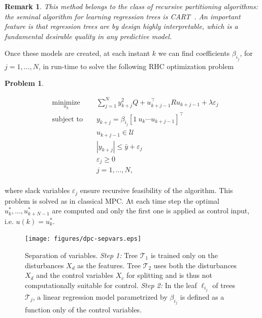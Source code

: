 \documentclass[letterpaper, 10 pt, conference]{ifacconf}  %
\newtheorem{problem}{Problem}
\newtheorem{remark}{Remark}
\begin{document}
\begin{remark}
	This method belongs to the class of recursive partitioning algorithms: the seminal algorithm for learning regression trees is CART~\cite{Breiman1984classification}. An important feature is that regression trees are by design highly interpretable, which is a fundamental desirable quality in any predictive model.
\end{remark}
Once these models are created, at each instant $k$ we can find coefficients $\beta_{i_j}$, for $j=1,\ldots,N$, in run-time to solve the following RHC optimization problem
\begin{problem}\label{pbDPC}

\small
\begin{equation*}
\begin{aligned}
& \underset{u_k}{\text{minimize}} & &  \sum_{j=1}^{N} y_{k+j}^2 Q + u^\top_{k+j-1} R u_{k+j-1} +  \lambda\varepsilon_j  \\
& \text{subject to }            & &  y_{k+j}        =   \beta_{i_j} [1\ u_{k} \cdots u_{k+j-1} ]^\top                   \\
&                               & &  u_{k+j-1}     \in  \mathcal{U}                                                     \\
&                               & &  |y_{k+j}|     \leq \bar{y} + \varepsilon_j 										\\
&                               & &  \varepsilon_j \geq  0																\\
&                               & &  j              =    1,\ldots,N,            									    \\
\end{aligned}
\end{equation*}
\normalsize
\end{problem}

where slack variables $\varepsilon_j$ ensure recursive feasibility of the algorithm. This problem is solved as in classical MPC. At each time step the optimal $u^*_k,\ldots,u^*_{k+N-1}$ are computed and only the first one is applied as control input, i.e. $u(k) = u^*_k$.
\begin{figure}[t!]
	\begin{center}
		\texttt{[image: figures/dpc-sepvars.eps]}
		\caption{Separation of variables. \textit{Step 1:} Tree $\mathcal{T}_1$ is trained only on the disturbances $X_d$ as the features. Tree $\mathcal{T}_2$ uses both the disturbances $X_d$ and the control variables $X_c$ for splitting and is thus not computationally suitable for control. \textit{Step 2:} In the leaf $\ell_{i_j}$ of trees $\mathcal{T}_j$, a linear regression model parametrized by $\beta_{i_j}$ is defined as a function only of the control variables.}\label{figSeparationVariables}
	\end{center}
\end{figure}
\end{document}
